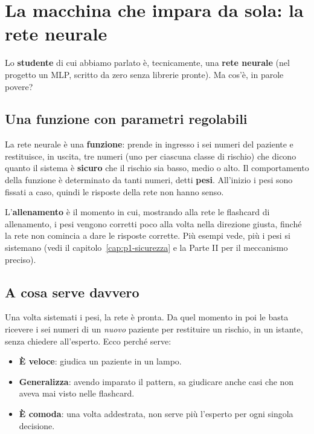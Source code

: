 \chapter{La macchina che impara da sola: la rete neurale}\label{cap:p1-rete}


Lo \textbf{studente} di cui abbiamo parlato è, tecnicamente, una \textbf{rete
neurale} (nel progetto un MLP, scritto da zero senza librerie pronte). Ma
cos'è, in parole povere?

\section{Una funzione con parametri regolabili}\label{sec:p1-rete-manopole}

La rete neurale è una \textbf{funzione}: prende in ingresso i sei numeri del
paziente e restituisce, in uscita, tre numeri (uno per ciascuna classe di
rischio) che dicono quanto il sistema è \textbf{sicuro} che il rischio sia
basso, medio o alto. Il comportamento della funzione è determinato da tanti
numeri, detti \textbf{pesi}. All'inizio i pesi sono fissati a caso, quindi le
risposte della rete non hanno senso.

L'\textbf{allenamento} è il momento in cui, mostrando alla rete le flashcard di
allenamento, i pesi vengono corretti poco alla volta nella direzione giusta,
finché la rete non comincia a dare le risposte corrette. Più esempi vede, più
i pesi si sistemano (vedi il capitolo~\ref{cap:p1-sicurezza} e la Parte II per
il meccanismo preciso).

\section{A cosa serve davvero}\label{sec:p1-rete-a-cosa-serve}

Una volta sistemati i pesi, la rete è pronta. Da quel momento in poi le basta
ricevere i sei numeri di un \emph{nuovo} paziente per restituire un rischio, in
un istante, senza chiedere all'esperto. Ecco perché serve:

\begin{itemize}
  \item \textbf{È veloce}: giudica un paziente in un lampo.
  \item \textbf{Generalizza}: avendo imparato il pattern, sa giudicare anche
        casi che non aveva mai visto nelle flashcard.
  \item \textbf{È comoda}: una volta addestrata, non serve più l'esperto per
        ogni singola decisione.
\end{itemize}

